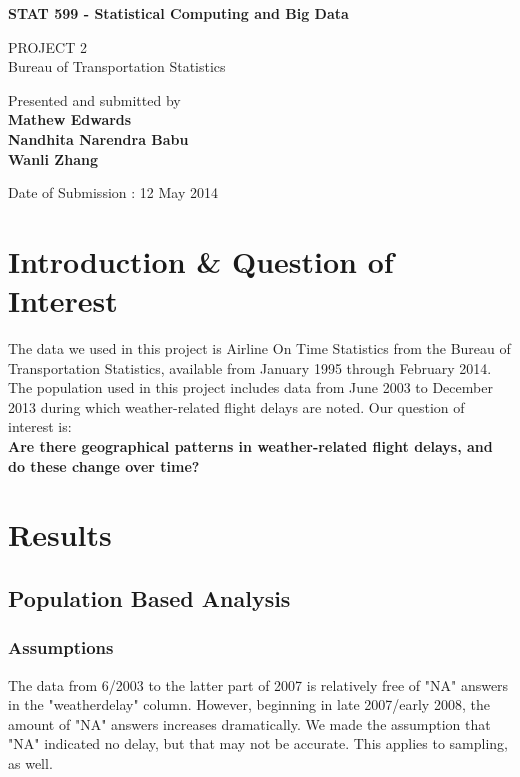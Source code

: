 \documentclass{article}
\begin{document}
\begin{titlepage}
    \begin{center}
        \vspace*{1cm}
        
        \Huge
        \textbf{STAT 599 - Statistical Computing and Big Data}
        
        \vspace{1cm}
        \LARGE
        PROJECT 2\\
        Bureau of Transportation Statistics
        
        \vspace{8cm}
        Presented and submitted by \\
        \textbf{Mathew Edwards} \\
        \textbf{Nandhita Narendra Babu} \\
        \textbf{Wanli Zhang}
        
        \vspace{0.5cm}
        Date of Submission : 12 May 2014
        
       
        
    \end{center}
\end{titlepage}



\section{Introduction \& Question of Interest}
The data we used in this project is Airline On Time Statistics from the Bureau of Transportation Statistics, available from January 1995 through February 2014. The population used in this project includes data from June 2003 to December 2013 during which weather-related flight delays are noted. Our question of interest is:\\
\textbf{Are there geographical patterns in weather-related flight delays, and do these change over time?}

\section{Results}
\subsection{Population Based Analysis}
\subsubsection{Assumptions}
The data from 6/2003 to the latter part of 2007 is relatively free of "NA" answers in the "weatherdelay" column. However, beginning in late 2007/early 2008, the amount of "NA" answers increases dramatically. We made the assumption that "NA" indicated no delay, but that may not be accurate. This applies to sampling, as well.
\end{document}

